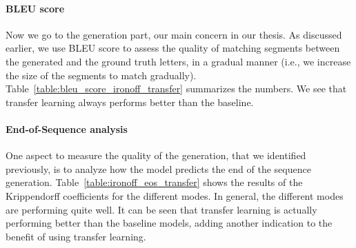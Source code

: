 
    \paragraph{BLEU score}
      Now we go to the generation part, our main concern in our thesis. As discussed earlier, we use BLEU score to assess the quality of matching segments between the generated and the ground truth letters, in a gradual manner (i.e., we increase the size of the segments to match gradually). Table~\ref{table:bleu_score_ironoff_transfer} summarizes the numbers. We see that transfer learning always performs better than the baseline.
    \paragraph{End-of-Sequence analysis}
    One aspect to measure the quality of the generation, that we identified previously, is to analyze how the model predicts the end of the sequence generation. Table~\ref{table:ironoff_eos_transfer} shows the results of the Krippendorff coefficients for the different modes. In general, the different modes are performing quite well. It can be seen that transfer learning is actually performing better than the baseline models, adding another indication to the benefit of using transfer learning.

